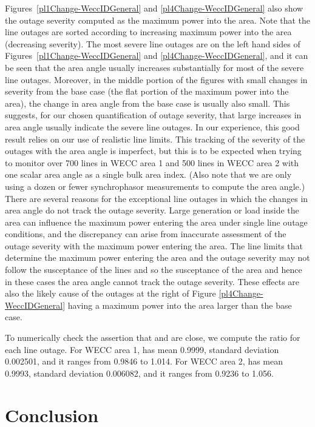 \documentclass[conference]{IEEEtran}
\begin{document}
{{  
 Figures~\ref{pl1Change-WeccIDGeneral} and  \ref{pl4Change-WeccIDGeneral} also show the outage severity computed as the maximum power into the area.
  Note that the line outages are sorted according to increasing  maximum power into the area (decreasing  severity). The most severe line outages are on the left hand sides of Figures~\ref{pl1Change-WeccIDGeneral} and  \ref{pl4Change-WeccIDGeneral}, and it 
  can be seen that the area angle usually increases substantially for  most of the severe line outages.  Moreover, in the middle portion of the figures with small changes in severity from the base case (the flat portion of the maximum
  power into the area), the change in area angle from the base case is usually also small.  
  This suggests, for our chosen quantification of outage severity, that large increases in area angle 
  usually indicate the severe line outages. 
  In our experience, this good  result relies on our use of  realistic line limits.
   This tracking of the severity of the outages with the area angle is imperfect, but 
    this is to be expected when trying to monitor over 700 lines in WECC area 1 and 500 lines in WECC area 2 with one scalar area angle as a single bulk area index. (Also note that we are only using a dozen or fewer synchrophasor measurements 
    to compute the area angle.)
   There are several reasons for the exceptional line outages in which the changes in area angle do not track the outage severity.
    Large generation or load inside the area can influence the maximum power entering the area under single line outage conditions,
    and the discrepancy can arise from inaccurate assessment of the outage severity with the maximum power entering the area.
    The line limits that determine the maximum power entering the area and the outage severity
   may not follow the susceptance of the lines and so the susceptance of the area and hence in these cases the area angle cannot track the outage severity. These effects are also the likely cause of the outages at the right of Figure  \ref{pl4Change-WeccIDGeneral} having a maximum power into the area larger than the base case.    

To numerically check the assertion that   and   are close,  we compute the ratio  for each line outage. 
For WECC area 1,
  has mean  0.9999, standard deviation 0.002501, and it ranges from 0.9846 to 1.014.
For WECC area 2,
  has mean  0.9993, standard deviation 0.006082, and it ranges from 0.9236 to 1.056.


\section{Conclusion}
\label{conclusion}

}}
\end{document}

